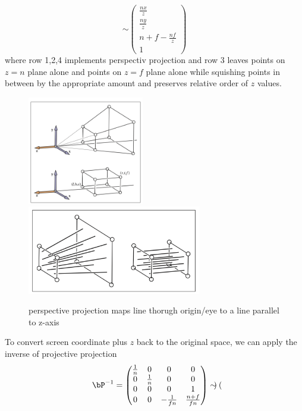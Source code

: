 \documentclass[11pt]{article}
\begin{document}
\begin{enumerate}
\[        \sim
        \begin{pmatrix}
            \frac{nx}{z} \\ 
            \frac{ny}{z} \\
            n+f-\frac{nf}{z} \\
            1
        \end{pmatrix}
    \]
    where row 1,2,4 implements perspectiv projection and row 3 leaves points on $z=n$ plane alone and points on $z=f$ plane alone while squishing points in between by the appropriate amount and preserves relative order of $z$ values.
    \begin{figure}[ht]
        \begin{center}
        \includegraphics[width=2in]{perspective_projection_1}
        \includegraphics[width=3in]{perspective_projection_2}
        \caption{perspective projection maps line thorugh origin/eye to a line parallel to z-axis}
        \end{center}
    \end{figure}
    To convert screen coordinate plus $z$ back to the original space, we can apply the inverse of projective projection
    \[
        \bP^{-1} = 
        \begin{pmatrix}
            \frac{1}{n} & 0 & 0 & 0 \\
            0 & \frac{1}{n} & 0 & 0 \\
            0 & 0 & 0 & 1 \\
            0 & 0 & -\frac{1}{fn} & \frac{n+f}{fn} \\
        \end{pmatrix}
        \sim
        \begin{pmatrix}

\end{pmatrix}\]
\end{enumerate}
\end{document}
